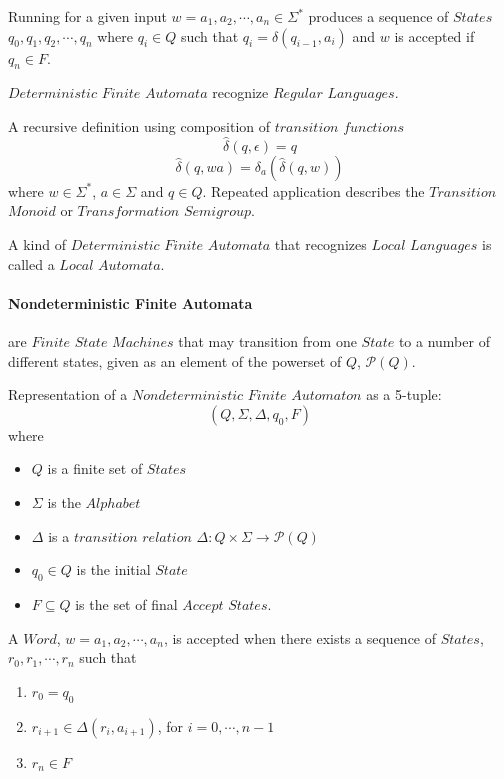 \documentclass{article}
\begin{document}
    Running for a given input $w = a_1,a_2, \cdots , a_n \in \Sigma^*$
    produces a sequence of $States$ $q_0,q_1,q_2,\cdots , q_n$ where
    $q_i \in Q$ such that $q_i = \delta (q_{i-1},a_i)$ and $w$ is
    accepted if $q_n \in F$.

    $Deterministic$ $Finite$ $Automata$ recognize $Regular$ $Languages$.

    A recursive definition using composition of $transition$ $functions$
    \[
        \widehat{\delta}(q,\epsilon) = q
    \]\[
        \widehat{\delta}(q,wa) = \delta_a(\widehat{\delta}(q,w))
    \]
    where $w \in \Sigma^*$, $a \in \Sigma$ and $q \in Q$. Repeated
    application describes the $Transition$ $Monoid$ or
    $Transformation$ $Semigroup$.

    A kind of $Deterministic$ $Finite$ $Automata$ that recognizes
    $Local$ $Languages$ is called a $Local$ $Automata$.

    \paragraph{Nondeterministic Finite Automata} are $Finite$ $State$
    $Machines$ that may transition from one $State$ to a number of
    different states, given as an element of the powerset of $Q$,
    $\mathcal{P}(Q)$.

    Representation of a $Nondeterministic$ $Finite$ $Automaton$ as a 5-tuple:
    \[
        (Q,\Sigma,\Delta,q_0,F)
    \]
    where
    \begin{itemize}
    \item $Q$ is a finite set of $States$
    \item $\Sigma$ is the $Alphabet$
    \item $\Delta$ is a $transition$ $relation$ $\Delta: Q \times
      \Sigma \rightarrow \mathcal{P}(Q)$
    \item $q_0 \in Q$ is the initial $State$
    \item $F \subseteq Q$ is the set of final $Accept$ $States$.
    \end{itemize}

    A $Word$, $w=a_1,a_2,\cdots,a_n$, is accepted when there exists a
    sequence of $States$, $r_0,r_1,\cdots,r_n$ such that
    \begin{enumerate}
    \item $r_0 = q_0$
    \item $r_{i+1} \in \Delta(r_i, a_{i+1})$, for $i = 0, \cdots, n-1$
    \item $r_n \in F$
    \end{enumerate}
\end{document}
